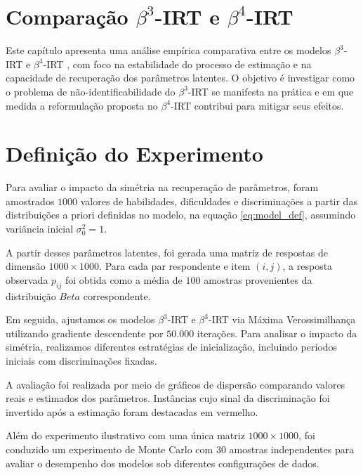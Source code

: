 \section{Comparação $\beta^{3}$-\gls{IRT} e $\beta^4$-\gls{IRT}}

Este capítulo apresenta uma análise empírica comparativa entre os modelos $\beta^{3}$-\gls{IRT} e $\beta^{4}$-\gls{IRT} , com foco na estabilidade do processo de estimação e na capacidade de recuperação dos parâmetros latentes. O objetivo é investigar como o problema de não-identificabilidade do $\beta^{3}$-\gls{IRT} se manifesta na prática e em que medida a reformulação proposta no $\beta^{4}$-\gls{IRT}  contribui para mitigar seus efeitos.

\section{Definição do Experimento}

Para avaliar o impacto da simétria  na recuperação de parâmetros, foram amostrados $1000$ valores de habilidades, dificuldades e discriminações a partir das distribuições a priori definidas no modelo, na equação \ref{eq:model_def}, assumindo variância inicial $\sigma_{0}^2 = 1$.

A partir desses parâmetros latentes, foi gerada uma matriz de respostas de dimensão $1000 \times 1000$. Para cada par respondente e item $(i, j)$, a resposta observada $p_{ij}$ foi obtida como a média de $100$ amostras provenientes da distribuição $Beta$ correspondente.

Em seguida, ajustamos os modelos $\beta^3$-\gls{IRT} e $\beta^3$-\gls{IRT} via Máxima Verossimilhança utilizando gradiente descendente por $50.000$ iterações. Para analisar o impacto da simétria, realizamos diferentes estratégias de inicialização, incluindo períodos iniciais com discriminações fixadas.

A avaliação foi realizada por meio de gráficos de dispersão comparando valores reais e estimados dos parâmetros. Instâncias cujo sinal da discriminação foi invertido após a estimação foram destacadas em vermelho.

Além do experimento ilustrativo com uma única matriz 
$1000\times1000$, foi conduzido um experimento de Monte Carlo com $30$ amostras independentes para avaliar o desempenho dos modelos sob diferentes configurações de dados.

